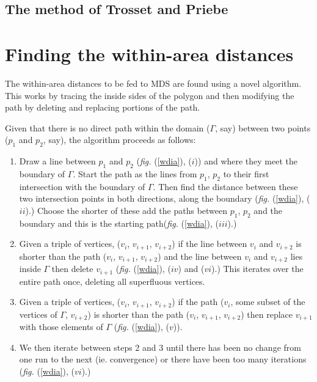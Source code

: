 \documentclass[a4paper,10pt]{amsart}
\newcommand{\fig}[1]{\emph{fig.} (\ref{#1})}
\begin{document}
\subsection{The method of Trosset and Priebe}






\section{Finding the within-area distances}

The within-area distances to be fed to MDS are found using a novel algorithm. This works by tracing the inside sides of the polygon and then modifying the path by deleting and replacing portions of the path. 

Given that there is no direct path within the domain ($\Gamma$, say) between two points ($p_1$ and $p_2$, say), the algorithm proceeds as follows:

\begin{enumerate}
\item Draw a line between $p_1$ and $p_2$ (\fig{wdia}, ($i$)) and where they meet the boundary of $\Gamma$. Start the path as the lines from $p_1$, $p_2$ to their first intersection with the boundary of $\Gamma$. Then find the distance between these two intersection points in both directions, along the boundary (\fig{wdia}, ($ii$).) Choose the shorter of these add the paths between $p_1$, $p_2$ and the boundary and this is the starting path(\fig{wdia}, ($iii$).) 
\item Given a triple of vertices, ($v_i$, $v_{i+1}$, $v_{i+2}$) if the line between $v_i$ and $v_{i+2}$ is shorter than the path ($v_i$, $v_{i+1}$, $v_{i+2}$) and the line between $v_i$ and $v_{i+2}$ lies inside $\Gamma$ then delete $v_{i+1}$ (\fig{wdia}, ($iv$) and ($vi$).) This iterates over the entire path once, deleting all superfluous vertices. 
\item Given a triple of vertices, ($v_i$, $v_{i+1}$, $v_{i+2}$) if the path ($v_i$, some subset of the vertices of $\Gamma$, $v_{i+2}$) is shorter than the path ($v_i$, $v_{i+1}$, $v_{i+2}$) then replace $v_{i+1}$ with those elements of $\Gamma$ (\fig{wdia}, ($v$)). 
\item We then iterate between steps 2 and 3 until there has been no change from one run to the next (ie. convergence) or there have been too many iterations (\fig{wdia}, ($vi$).)
\end{enumerate}
\end{document}
